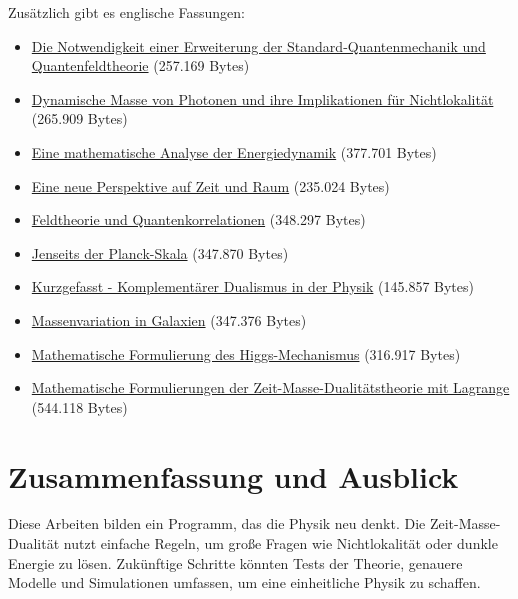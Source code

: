 \documentclass[a4paper,12pt]{article}
\newcommand{\repobase}{https://github.com/jpascher/T0-Time-Mass-Duality/tree/main/2/}
\begin{document}
	Zusätzlich gibt es englische Fassungen:
	\begin{itemize}
		\item \small\href{\repobase/pdf/English/Die Notwendigkeit einer Erweiterung der Standard-Quantenmechanik und Quantenfeldtheorie_en.pdf}{Die Notwendigkeit einer Erweiterung der Standard-Quantenmechanik und Quantenfeldtheorie} (257.169 Bytes)
		\item \small\href{\repobase/pdf/English/Dynamische Masse von Photonen und ihre Implikationen für Nichtlokalität_en.pdf}{Dynamische Masse von Photonen und ihre Implikationen für Nichtlokalität} (265.909 Bytes)
		\item \small\href{\repobase/pdf/English/Eine mathematische Analyse der Energiedynamik_en.pdf}{Eine mathematische Analyse der Energiedynamik} (377.701 Bytes)
		\item \small\href{\repobase/pdf/English/Eine neue Perspektive auf Zeit und Raum Johann Paschers revolutionäre Ideen_en.pdf}{Eine neue Perspektive auf Zeit und Raum} (235.024 Bytes)
		\item \small\href{\repobase/pdf/English/Feldtheorie und Quantenkorrelationen_en.pdf}{Feldtheorie und Quantenkorrelationen} (348.297 Bytes)
		\item \small\href{\repobase/pdf/English/Jenseits der Planck-Skala_en.pdf}{Jenseits der Planck-Skala} (347.870 Bytes)
		\item \small\href{\repobase/pdf/English/Kurzgefasst - Komplementärer Dualismus in der Physik - Von Welle-Teilchen zum Zeit-Masse-Konzept_en.pdf}{Kurzgefasst - Komplementärer Dualismus in der Physik} (145.857 Bytes)
		\item \small\href{\repobase/pdf/English/Massenvariation in Galaxien_en.pdf}{Massenvariation in Galaxien} (347.376 Bytes)
		\item \small\href{\repobase/pdf/English/Mathematische Formulierung des Higgs-Mechanismus in der Zeit-Masse-Dualität_en.pdf}{Mathematische Formulierung des Higgs-Mechanismus} (316.917 Bytes)
		\item \small\href{\repobase/pdf/English/Mathematische Formulierungen der Zeit-Masse-Dualitätstheorie mit Lagrange_en.pdf}{Mathematische Formulierungen der Zeit-Masse-Dualitätstheorie mit Lagrange} (544.118 Bytes)
	\end{itemize}
	
	\section{Zusammenfassung und Ausblick}
	
	Diese Arbeiten bilden ein Programm, das die Physik neu denkt. Die Zeit-Masse-Dualität nutzt einfache Regeln, um große Fragen wie Nichtlokalität oder dunkle Energie zu lösen. Zukünftige Schritte könnten Tests der Theorie, genauere Modelle und Simulationen umfassen, um eine einheitliche Physik zu schaffen.
	
\end{document}
